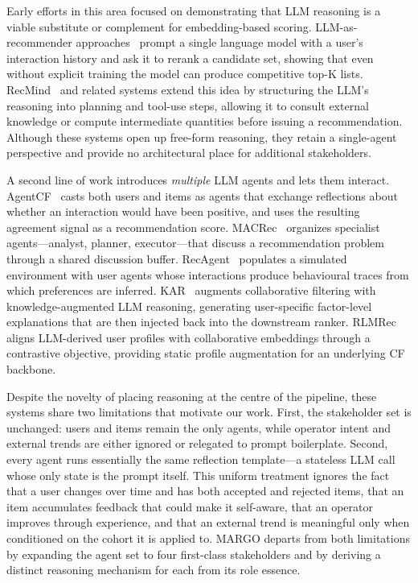 \documentclass[master,english,final]{postech-ucs}
\begin{document}
Early efforts in this area focused on demonstrating that LLM reasoning is a viable substitute or complement for embedding-based scoring.
LLM-as-recommender approaches~\cite{hou2024llmrec} prompt a single language model with a user's interaction history and ask it to rerank a candidate set, showing that even without explicit training the model can produce competitive top-K lists.
RecMind~\cite{wang2023recmind} and related systems extend this idea by structuring the LLM's reasoning into planning and tool-use steps, allowing it to consult external knowledge or compute intermediate quantities before issuing a recommendation.
Although these systems open up free-form reasoning, they retain a single-agent perspective and provide no architectural place for additional stakeholders.

A second line of work introduces \emph{multiple} LLM agents and lets them interact.
AgentCF~\cite{zhang2024agentcf} casts both users and items as agents that exchange reflections about whether an interaction would have been positive, and uses the resulting agreement signal as a recommendation score.
MACRec~\cite{wang2024macrec} organizes specialist agents---analyst, planner, executor---that discuss a recommendation problem through a shared discussion buffer.
RecAgent~\cite{wang2024recagent} populates a simulated environment with user agents whose interactions produce behavioural traces from which preferences are inferred.
KAR~\cite{xi2024kar} augments collaborative filtering with knowledge-augmented LLM reasoning, generating user-specific factor-level explanations that are then injected back into the downstream ranker.
RLMRec~\cite{ren2024rlmrec} aligns LLM-derived user profiles with collaborative embeddings through a contrastive objective, providing static profile augmentation for an underlying CF backbone.

Despite the novelty of placing reasoning at the centre of the pipeline, these systems share two limitations that motivate our work.
First, the stakeholder set is unchanged: users and items remain the only agents, while operator intent and external trends are either ignored or relegated to prompt boilerplate.
Second, every agent runs essentially the same reflection template---a stateless LLM call whose only state is the prompt itself.
This uniform treatment ignores the fact that a user changes over time and has both accepted and rejected items, that an item accumulates feedback that could make it self-aware, that an operator improves through experience, and that an external trend is meaningful only when conditioned on the cohort it is applied to.
MARGO departs from both limitations by expanding the agent set to four first-class stakeholders and by deriving a distinct reasoning mechanism for each from its role essence.
\end{document}
